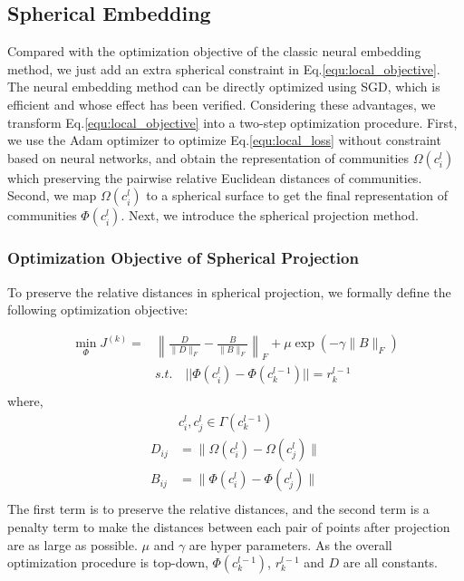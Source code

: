 \documentclass{article}
\theoremstyle{definition}
\begin{document}
	 
	 
	 \subsection{Spherical Embedding}
	 Compared with the optimization objective of the classic neural embedding method, we just add an extra spherical constraint in Eq.\ref{equ:local_objective}. The neural embedding method can be directly optimized using SGD, which is efficient and whose effect has been verified. Considering these advantages, we transform Eq.\ref{equ:local_objective} into a two-step optimization procedure. First, we use the Adam optimizer\cite{Rushing2005ADaM} to optimize Eq.\ref{equ:local_loss} without constraint based on neural networks, and obtain the representation of communities $\Omega(c^l_i)$ which preserving the pairwise relative Euclidean distances of communities. Second, we map $\Omega(c^l_i)$ to a spherical surface to get the final representation of communities $\Phi(c_i^l)$. Next, we introduce the spherical projection method.
	 
	 \subsubsection{Optimization Objective of Spherical Projection}
	 To preserve the relative distances in spherical projection, we formally define the following optimization objective: 

    \begin{equation}
    \label{equ:sphere_objective}
    \begin{split}
    \min_{\Phi} J^{(k)} =  & \left\lVert\frac{D}{\lVert D \rVert_F} - \frac{B}{\lVert B \rVert_F}\right\rVert_F + \mu \exp(- \gamma \lVert B \rVert_F)\\ 
    & s.t. \quad || \Phi(c_i^{l})  - \Phi(c_k^{l-1})||= r_k^{l-1}\\
    \end{split}
    \end{equation}
	 where,
	 \[
	 \begin{split}
	 	& c_i^l,c_j^l \in \Gamma(c_k^{l-1}) \\
	 	D_{ij} & = \lVert \Omega(c^{l}_i) - \Omega(c^{l}_j)\rVert \\
	 	B_{ij} & = \lVert \Phi(c^{l}_i) - \Phi(c^{l}_j)\rVert \\
	 \end{split}
	 \]
	 The first term is to preserve the relative distances, and the second term is a penalty term to make the distances between each pair of points after projection are as large as possible. $\mu$ and $\gamma$ are hyper parameters. As the overall optimization procedure is top-down, $\Phi(c_k^{l-1})$, $r_k^{l-1}$ and $D$ are all constants. 
   
\end{document}
